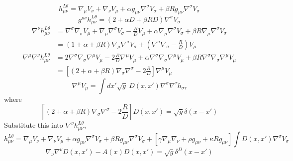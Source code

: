 \documentclass[10pt,letterpaper]{article}
\begin{document}
\newpage
\begin{equation}
h_{\mu\nu}^{L\theta} = \nabla_\mu V_\nu +\nabla_\nu V_\mu + \alpha g_{\mu\nu} \nabla^\sigma V_\sigma + \beta R g_{\mu\nu} \nabla^\sigma V_\sigma
\end{equation}
\begin{equation}
g^{\mu\nu}h_{\mu\nu}^{L\theta} = (2+\alpha D +\beta R D)\nabla^\sigma V_\sigma
\end{equation}
\begin{align}
\nabla^\nu h_{\mu\nu}^{L\theta} &= \nabla^\sigma \nabla_\sigma V_\mu + \nabla_\mu \nabla^\sigma V_\sigma - \frac{R}{D}V_\mu +\alpha \nabla_\mu \nabla^\sigma V_\sigma + \beta R \nabla_\mu \nabla^\sigma V_{\sigma}
\nonumber\\
&= ( 1+\alpha +\beta R) \nabla_\mu\nabla^\sigma V_\sigma + \left(\nabla^\sigma \nabla_\sigma- \frac{R}{D}\right) V_\mu
\end{align}
\begin{align}
\nabla^\mu \nabla^\nu h_{\mu\nu}^{L\theta} &= 2\nabla^\sigma \nabla_\sigma \nabla^\mu V_\mu -2\frac RD \nabla^\mu V_\mu  + \alpha \nabla^\sigma \nabla_\sigma \nabla^\mu  V_\mu + \beta R \nabla^\sigma \nabla_\sigma \nabla^\mu V_\mu
\nonumber\\
&= \left[ \left( 2 + \alpha +\beta R\right) \nabla_\sigma \nabla^\sigma -2\frac{R}{D}\right] \nabla^\mu V_{\mu}
\end{align}
\begin{equation}
\nabla^\mu V_{\mu} = \int dx' \sqrt{g}\ D(x,x') \nabla^\sigma \nabla^\tau h_{\sigma\tau}
\end{equation}
where
\begin{equation}
\left[ \left( 2 + \alpha +\beta R\right) \nabla_\sigma \nabla^\sigma -2\frac{R}{D}\right]D(x,x') = \sqrt g \delta(x-x')
\end{equation}
Substitute this into $\nabla^\nu h_{\mu\nu}^{L\theta}$,
\begin{equation}
h_{\mu\nu}^{L\theta} = \nabla_\mu V_\nu +\nabla_\nu V_\mu + \alpha g_{\mu\nu} \nabla^\sigma V_\sigma + \beta R g_{\mu\nu} \nabla^\sigma V_\sigma
+\left[ \gamma \nabla_\mu \nabla_\nu + \rho g_{\mu\nu} + \kappa R g_{\mu\nu} \right] \int D(x,x') \nabla^\sigma V_\sigma
\end{equation}
\begin{equation}
\nabla_\nu \nabla^\nu D(x,x') - A(x) D(x,x') = \sqrt g \delta^D(x-x')
\end{equation}
\end{document}
